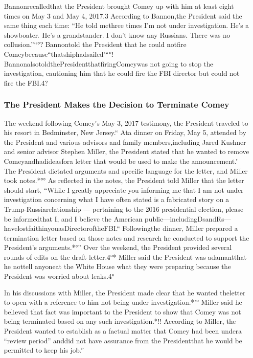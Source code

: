 {Bannonrecalledthat the President brought Comey up with him at least eight times on May 3 and May 4, 2017.3 According to Bannon,the President said the same thing each time: “He told methree times I’m not under investigation. He’s a showboater. He’s a grandstander. I don’t know any Russians. There was no collusion.”“°? Bannontold the President that he could notfire Comeybecause“thatshiphadsailed’“°! BannonalsotoldthePresidentthatfiringComeywas not going to stop the investigation, cautioning him that he could fire the FBI director but could not fire the FBI.4?

\subsubsection{The President Makes the Decision to Terminate Comey}

The weekend following Comey’s May 3, 2017 testimony, the President traveled to his resort in Bedminster, New Jersey.“ Ata dinner on Friday, May 5, attended by the President and various advisors and family members,including Jared Kushner and senior advisor Stephen Miller, the President stated that he wanted to remove Comeyandhadideasfora letter that would be used to make the announcement.’ The President dictated arguments and specific language for the letter, and Miller took notes.*°° As reflected in the notes, the President told Miller that the letter should start, “While I greatly appreciate you informing me that I am not under investigation concerning what I have often stated is a fabricated story on a Trump-Russiarelationship — pertaining to the 2016 presidential election, please be informedthat I, and I believe the American public—includingDsandRs—havelostfaithinyouasDirectoroftheFBI.“ Followingthe dinner, Miller prepared a termination letter based on those notes and research he conducted to support the President’s arguments.*°” Over the weekend, the President provided several rounds of edits on the draft letter.4°* Miller said the President was adamantthat he nottell anyoneat the White House what they were preparing because the President was worried about leaks.4°

In his discussions with Miller, the President made clear that he wanted theletter to open with a reference to him not being under investigation.*'° Miller said he believed that fact was important to the President to show that Comey was not being terminated based on any such investigation.*!! According to Miller, the President wanted to establish as a factual matter that Comey had been undera “review period” anddid not have assurance from the Presidentthat he would be permitted to keep his job.”

}
